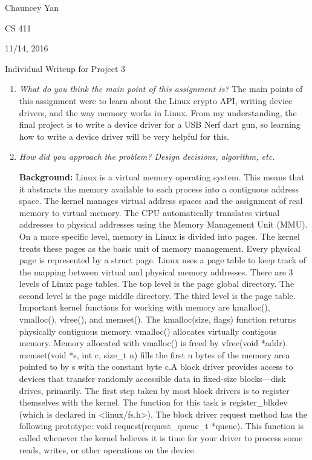 \documentclass[letterpaper,10pt,titlepage]{article}
\newcommand{\ignore}[2]{\hspace{0in}#2} %
\newcommand{\tab}{\hspace*{2em}} %
\def\name{Chauncey Yan}
\def\project{Project 3}
\def\date{11/14, 2016}
\begin{document}
\name

CS 411

\date

\begin{center}
{\LARGE Individual Writeup for \project}
\end{center}

\begin{enumerate} 
\item \emph{What do you think the main point of this assignment is?}
The main points of this assignment were to learn about the Linux crypto API, writing device drivers, and the way memory works in Linux. From my understanding, the final project is to write a device driver for a USB Nerf dart gun, so learning how to write a device driver will be very helpful for this.

\item \emph{How did you approach the problem? Design decisions, algorithm, etc.}

\tab \textbf{Background:} 
\tab Linux is a virtual memory operating system. This means that it abstracts the memory available to each process into a contiguous address space. The kernel manages virtual address spaces and the assignment of real memory to virtual memory. The CPU automatically translates virtual addresses to physical addresses using the Memory Management Unit (MMU)\ignore{source:http://en.wikipedia.org/wiki/Virtual_memory}. On a more specific level, memory in Linux is divided into pages. The kernel treats these pages as the basic unit of memory management\ignore{source:Love pg. 231}. Every physical page is represented by a struct page. Linux uses a page table to keep track of the mapping between virtual and physical memory addresses. There are 3 levels of Linux page tables. The top level is the page global directory. The second level is the page middle directory. The third level is the page table. Important kernel functions for working with memory are kmalloc(), vmalloc(), vfree(), and memset(). The kmalloc(size, flags) function returns physically contiguous memory. vmalloc() allocates virtually contigous memory. Memory allocated with vmalloc() is freed by vfree(void *addr). memset(void *s, int c, size\_t n) fills the first n bytes of the memory area pointed to by s with the constant byte c.\ignore{source: http://linux.die.net/man/3/memset}

\tab A block driver provides access to devices that transfer randomly accessible data in fixed-size blocks—disk drives, primarily. The first step taken by most block drivers is to register themselves with the kernel. The function for this task is register\_blkdev (which is declared in <linux/fs.h>). The block driver request method has the following prototype: void request(request_queue_t *queue). This function is called whenever the kernel believes it is time for your driver to process some reads, writes, or other operations on the device\ignore{source: http://lwn.net/images/pdf/LDD3/ch16.pdf}. 


\end{enumerate}
\end{document}
